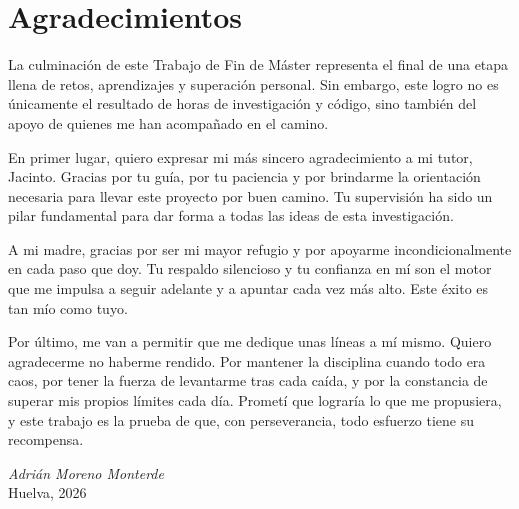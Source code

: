 %
%
\chapter*{Agradecimientos} %

La culminación de este Trabajo de Fin de Máster representa el final de una etapa llena de retos, aprendizajes y superación personal. Sin embargo, este logro no es únicamente el resultado de horas de investigación y código, sino también del apoyo de quienes me han acompañado en el camino. 

En primer lugar, quiero expresar mi más sincero agradecimiento a mi tutor, Jacinto. Gracias por tu guía, por tu paciencia y por brindarme la orientación necesaria para llevar este proyecto por buen camino. Tu supervisión ha sido un pilar fundamental para dar forma a todas las ideas de esta investigación. 

A mi madre, gracias por ser mi mayor refugio y por apoyarme incondicionalmente en cada paso que doy. Tu respaldo silencioso y tu confianza en mí son el motor que me impulsa a seguir adelante y a apuntar cada vez más alto. Este éxito es tan mío como tuyo. 

Por último, me van a permitir que me dedique unas líneas a mí mismo. Quiero agradecerme  no haberme rendido. Por mantener la disciplina cuando todo era caos, por tener la fuerza de levantarme tras cada caída, y por la constancia de superar mis propios límites cada día. Prometí que lograría lo que me propusiera, y este trabajo es la prueba de que, con perseverancia, todo esfuerzo tiene su recompensa.  



\begin{flushright}
  \vspace{1.5cm}  %
  \textit{Adrián Moreno Monterde}\\
  Huelva, 2026
\end{flushright}